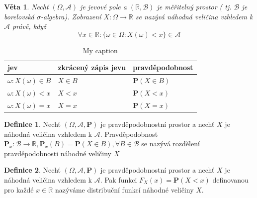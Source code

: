 \documentclass[a4]{report}
\newtheorem{theorem}{Věta}
\theoremstyle{definition}
\newtheorem{definition}{Definice}[section]
\begin{document}
{\begin{theorem}
Nechť $( \Omega, \mathcal{A}) $ je jevové pole a $(\mathbb{R}, \mathcal{B})$ je měřitelný prostor ( tj. $\mathcal{B}$ je borelovská $\sigma$-algebra). Zobrazení $X:\Omega \rightarrow \mathbb{R}$ se nazývá \textit{náhodná veličina} vzhledem k $\mathcal{A}$ právě, když 
\begin{equation}
\forall x \in \mathbb{R} : \{ \omega \in \Omega: X(\omega)< x\}\in \mathcal{A}
\end{equation}
\end{theorem}


\begin{table}[h]
\centering
\caption{My caption}
\label{my-label}
\begin{tabular}{lll}
jev &zkrácený zápis jevu  & pravděpodobnost  \\
\hline
$\omega:X(\omega)\in B$ &$X\in B$  &$\textbf{P}(X\in B)$  \\
$\omega:X(\omega)< x$ &$X < x$  &$\textbf{P}(X<x)$  \\
$\omega:X(\omega)=x $ &$X=x$  &$\textbf{P}(X=x)$  
\end{tabular}
\end{table}



\begin{definition}
Nechť $(\Omega,\mathcal{A},\textbf{P})$ je pravděpodobnostní prostor a nechť $X$ je náhodná veličina vzhledem k $\mathcal{A}$. Pravděpodobnost $\textbf{P}_x:\mathcal{B}\rightarrow \mathbb{R}, \textbf{P}_x(B)=\textbf{P}(X\in B), \forall B\in \mathcal{B}$ se nazývá rozdělení pravděpodobnosti náhodné veličiny $X$
\end{definition}



\begin{definition}
Nechť $(\Omega,\mathcal{A},\textbf{P})$ je pravděpodobnostní prostor a nechť $X$ je náhodná veličina vzhledem k $\mathcal{A}$. Pak funkci $F_X(x)=\textbf{P}(X<x)$ definovanou pro každé $x\in \mathbb{R}  $ nazýváme distribuční funkcí náhodné veličiny $X$.
\end{definition}

}
\end{document}

